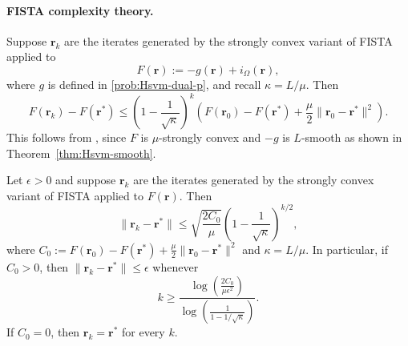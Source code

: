 \documentclass[twoside,11pt]{article}
\renewcommand\r{\bm{r}}
\begin{document}
\paragraph{FISTA complexity theory.}
Suppose $\r_k$ are the iterates generated by the strongly convex variant of FISTA applied to
\[
    F(\r) := -g(\r) + i_{\Omega}(\r),
\]
where $g$ is defined in \eqref{prob:Hsvm-dual-p}, and recall $\kappa = L/\mu$. Then
\[
    F(\r_k) - F(\r^*) \leq \left(1 - \frac{1}{\sqrt{\kappa}}\right)^k\left(F(\r_0) - F(\r^*) + \frac{\mu}{2}\|\r_0 - \r^*\|^2\right).
\]
This follows from \cite[Theorem~10.42]{Beck2017}, since $F$ is $\mu$-strongly convex and $-g$ is $L$-smooth as shown in Theorem~\ref{thm:Hsvm-smooth}.
\begin{lemma}\label{lem:Hsvm-FISTA-iters}
Let $\epsilon > 0$ and suppose $\r_k$ are the iterates generated by the strongly convex variant of FISTA applied to $F(\r)$. Then
    \begin{equation} \label{eqn:Hsvm-FISTA-error}
        \|\r_k - \r^*\| \leq \sqrt{\frac{2C_0}{\mu}}\left(1 - \frac{1}{\sqrt{\kappa}}\right)^{k/2},
    \end{equation}
    where $C_0 := F(\r_0) - F(\r^*) + \frac{\mu}{2}\|\r_0 - \r^*\|^2$ and $\kappa = L/\mu$. In particular, if $C_0 > 0$, then $\|\r_k - \r^*\| \leq \epsilon$ whenever
    \begin{equation} \label{eqn:Hsvm-FISTA-iters}
        k \geq \frac{\log\left(\frac{2C_0}{\mu\epsilon^2}\right)}{\log\left(\frac{1}{1-1/\sqrt{\kappa}}\right)}.
    \end{equation}
    If $C_0=0$, then $\r_k=\r^*$ for every $k$.
\end{lemma}
\end{document}

